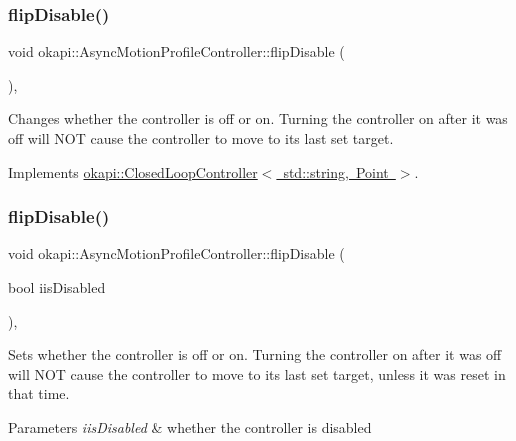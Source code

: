 \subsubsection{\texorpdfstring{flipDisable()}{flipDisable()}\hspace{0.1cm}{\footnotesize\ttfamily [1/2]}}
{\footnotesize\ttfamily void okapi\+::\+Async\+Motion\+Profile\+Controller\+::flip\+Disable (\begin{DoxyParamCaption}{ }\end{DoxyParamCaption})\hspace{0.3cm}{\ttfamily [override]}, {\ttfamily [virtual]}}

Changes whether the controller is off or on. Turning the controller on after it was off will N\+OT cause the controller to move to its last set target. 

Implements \mbox{\hyperlink{classokapi_1_1ClosedLoopController_a9de69b60885df41cd2164fe1a23f34d3}{okapi\+::\+Closed\+Loop\+Controller$<$ std\+::string, Point $>$}}.

\mbox{\label{classokapi_1_1AsyncMotionProfileController_a3dc30b14b36f1fc1fc61c9c45ced002e}} 
\subsubsection{\texorpdfstring{flipDisable()}{flipDisable()}\hspace{0.1cm}{\footnotesize\ttfamily [2/2]}}
{\footnotesize\ttfamily void okapi\+::\+Async\+Motion\+Profile\+Controller\+::flip\+Disable (\begin{DoxyParamCaption}\item[{bool}]{iis\+Disabled }\end{DoxyParamCaption})\hspace{0.3cm}{\ttfamily [override]}, {\ttfamily [virtual]}}

Sets whether the controller is off or on. Turning the controller on after it was off will N\+OT cause the controller to move to its last set target, unless it was reset in that time.


\begin{DoxyParams}{Parameters}
{\em iis\+Disabled} & whether the controller is disabled \\
\hline
\end{DoxyParams}


